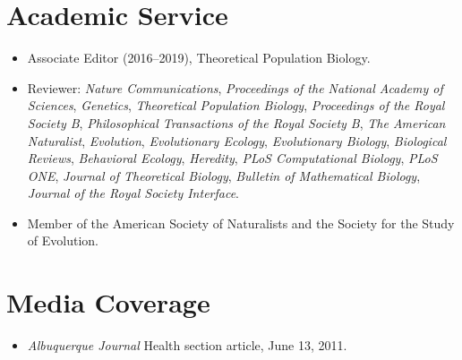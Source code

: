 \documentclass[11pt]{article}
\begin{document}

  \section{Academic Service}
  \begin{itemize}
    \item Associate Editor (2016--2019), Theoretical Population Biology.
    \item Reviewer: \textit{Nature Communications}, \textit{Proceedings of the National Academy of Sciences}, \textit{Genetics}, \textit{Theoretical Population Biology}, \textit{Proceedings of the Royal Society B}, \textit{Philosophical Transactions of the Royal Society B}, \textit{The American Naturalist}, \textit{Evolution}, \textit{Evolutionary Ecology}, \textit{Evolutionary Biology}, \textit{Biological Reviews}, \textit{Behavioral Ecology}, \textit{Heredity}, \textit{PLoS Computational Biology}, \textit{PLoS ONE}, \textit{Journal of Theoretical Biology}, \textit{Bulletin of Mathematical Biology}, \textit{Journal of the Royal Society Interface}.
  \item Member of the American Society of Naturalists and the Society for the Study of Evolution.
  \end{itemize}
  

  \section{Media Coverage}
  \begin{itemize}
  \item \textit{Albuquerque Journal} Health section article, June 13, 2011.
  \end{itemize}


  \pagestyle{fancy}
\end{document}
